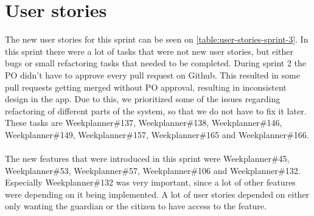 \section{User stories}
The new user stories for this sprint can be seen on \autoref{table:user-stories-sprint-3}.
In this sprint there were a lot of tasks that were not new user stories, but either bugs or small refactoring tasks that needed to be completed.
During sprint 2 the PO didn't have to approve every pull request on Github. 
This resulted in some pull requests getting merged without PO approval, resulting in inconsistent design in the app.
Due to this, we prioritized some of the issues regarding refactoring of different parts of the system, so that we do not have to fix it later.
These tasks are Weekplanner\#137, Weekplanner\#138, Weekplanner\#146, Weekplanner\#149, Weekplanner\#157, Weekplanner\#165 and Weekplanner\#166.
\\\\
The new features that were introduced in this sprint were Weekplanner\#45, Weekplanner\#53, Weekplanner\#57, Weekplanner\#106 and Weekplanner\#132.
Especially Weekplanner\#132 was very important, since a lot of other features were depending on it being implemented. 
A lot of user stories depended on either only wanting the guardian or the citizen to have access to the feature.

